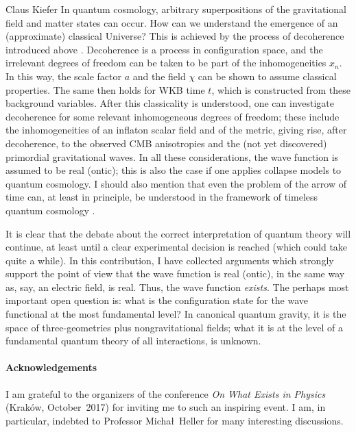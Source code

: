 \begin{artengenv}{Claus Kiefer}
In quantum cosmology, 
 arbitrary superpositions of the gravitational
field and matter states can occur. How can we understand the emergence
of an (approximate) classical Universe? This is achieved by the
process of decoherence introduced above \parencite{kiefer_claus_emergence_2012}. 
Decoherence is a process in
configuration space, and the irrelevant degrees of freedom can be
taken to be part of the inhomogeneities $x_n$. In this way, the scale
factor $a$ and the field $\chi$ can be shown to assume classical
properties. The same then holds for WKB time $t$, which is constructed
from these background variables. 
After this classicality is understood, one can investigate
decoherence for some relevant inhomogeneous degrees of freedom; these
include the inhomogeneities of an inflaton scalar field and
of the metric, giving rise, after decoherence, to the observed CMB
anisotropies and the (not yet discovered) primordial gravitational
waves. In all these considerations, the wave function is assumed to be
real (ontic); this is also the case if one applies collapse models to
quantum cosmology. I should also mention that even the problem of the
arrow of time can, at least in principle, be understood in the
framework of timeless quantum cosmology \parencite{zeh_physical_2007}.

It is clear that the debate about the correct interpretation of
quantum theory will continue, at least until a clear experimental
decision is reached (which could take quite a while). In this
contribution, I have collected arguments which strongly support the
point of view that the wave function is real (ontic), in the same way
as, say, an electric field, is real. Thus, the wave function {\em
  exists}. The perhaps most important open question is: what is the
configuration state for the wave functional at the most fundamental
level? In canonical quantum gravity, it is the space of
three-geometries plus nongravitational fields; what it is at the level
of a fundamental quantum theory of all interactions, is unknown.




\paragraph{Acknowledgements}

I am grateful to the organizers of the conference
{\em On What Exists in Physics} (Krak\'ow, October~2017) for inviting
me to such an  
inspiring event. I am, in particular, indebted to Professor Micha\l\
Heller for many interesting discussions.

\nocite{einstein_can_1935}




\end{artengenv}